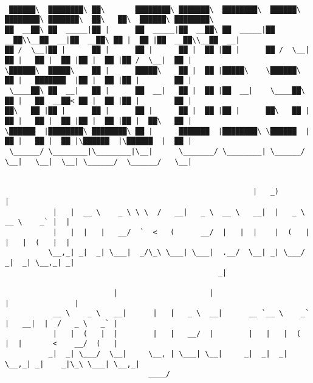 \documentclass[varwidth=\maxdimen,margin=0.5cm,multi={verbatim}]{standalone}
\begin{document}
\begin{verbatim}

 ██████\  ████████\ ██\       ████████\ ███████\  ████████\  ██████\ ████████\ ███████\  ██\   ██\  ██████\ ████████\
██  __██\ ██  _____|██ |      ██  _____|██  __██\ ██  _____|██  __██\\__██  __|██  __██\ ██ |  ██ |██  __██\\__██  __|
██ /  \__|██ |      ██ |      ██ |      ██ |  ██ |██ |      ██ /  \__|  ██ |   ██ |  ██ |██ |  ██ |██ /  \__|  ██ |
\██████\  █████\    ██ |      █████\    ██ |  ██ |█████\    \██████\    ██ |   ███████  |██ |  ██ |██ |        ██ |
 \____██\ ██  __|   ██ |      ██  __|   ██ |  ██ |██  __|    \____██\   ██ |   ██  __██< ██ |  ██ |██ |        ██ |
██\   ██ |██ |      ██ |      ██ |      ██ |  ██ |██ |      ██\   ██ |  ██ |   ██ |  ██ |██ |  ██ |██ |  ██\   ██ |
\██████  |████████\ ████████\ ██ |      ███████  |████████\ \██████  |  ██ |   ██ |  ██ |\██████  |\██████  |  ██ |
 \______/ \________|\________|\__|      \_______/ \________| \______/   \__|   \__|  \__| \______/  \______/   \__|


                                                         |   _)                       |
           |   |  __ \    _ \ \ \  /   __|   _ \  __ \   __|  |   _ \   __ \    _` |  |
           |   |  |   |   __/  `  <   (      __/  |   |  |    |  (   |  |   |  (   |  |
          \__,_| _|  _| \___|  _/\_\ \___| \___|  .__/  \__| _| \___/  _|  _| \__,_| _|
                                                 _|

                         |                     |                                |               |
           __ \    _ \   __|      |   |   _ \  __|      __ `__ \    _` |   __|  |  /   _ \   _` |
           |   |  (   |  |        |   |   __/  |        |   |   |  (   |  |       <    __/  (   |
          _|  _| \___/  \__|     \__, | \___| \__|     _|  _|  _| \__,_| _|    _|\_\ \___| \__,_|
                                 ____/



\end{verbatim}
\end{document}
